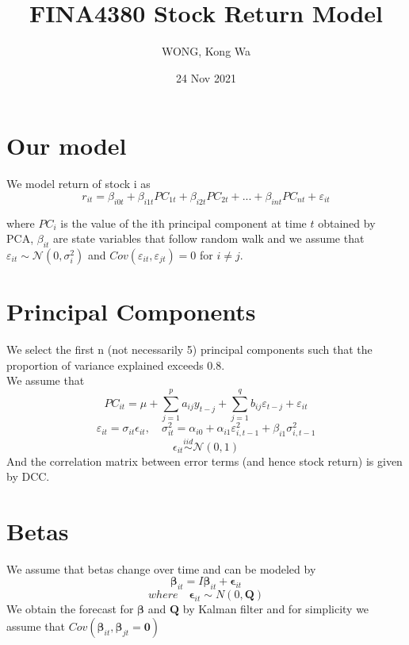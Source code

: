 \documentclass{article}
\title{FINA4380 Stock Return Model}
\author{WONG, Kong Wa}
\date{24 Nov 2021}
\begin{document}
\maketitle
\raggedright
\section{Our model}
We model return of stock i as
\begin{equation*}
	r_{it}=\beta_{i0t}+\beta_{i1t}PC_{1t}+\beta_{i2t}PC_{2t}+...+\beta_{int}PC_{nt}+\varepsilon_{it}
\end{equation*}

where $PC_i$ is the value of the ith principal component at time $t$ obtained by PCA, $\beta_{it}$ are state variables that follow random walk and we assume that $\varepsilon_{it} \sim \mathcal{N}(0, \sigma_i^2)$ and $Cov(\varepsilon_{it},\varepsilon_{jt})=0$ for $i \neq j$.

\section{Principal Components}
We select the first n (not necessarily 5) principal components such that the proportion of variance explained exceeds 0.8. \\
We assume that
\begin{equation*}
	PC_{it}=\mu+\sum_{j=1}^p a_{ij} y_{t-j}+\sum_{j=1}^q b_{ij} \varepsilon_{t-j}+\varepsilon_{it}
\end{equation*}
\begin{equation*}
	\varepsilon_{it}=\sigma_{it} \epsilon_{it}, \quad \sigma_{it}^2=\alpha_{i0}+\alpha_{i1} \varepsilon_{i,t-1}^2+ \beta_{i1} \sigma_{i,t-1}^2
\end{equation*}
\begin{equation*}
    \epsilon_{it} \stackrel{iid}{\sim} \mathcal{N}(0, 1)
\end{equation*}
And the correlation matrix between error terms (and hence stock return) is given by DCC.

\section{Betas}
We assume that betas change over time and can be modeled by
\begin{equation*}
    \mathbf{\beta}_{it} = I\mathbf{\beta}_{it}+\mathbf{\epsilon}_{it}
\end{equation*}
\begin{equation*}
    where \quad \mathbf{\epsilon}_{it} \sim N(0,\mathbf{Q})
\end{equation*}
We obtain the forecast for $\mathbf{\beta}$ and $\mathbf{Q}$ by Kalman filter and for simplicity we assume that $Cov(\mathbf{\beta}_{it}, \mathbf{\beta}_{jt} = \mathbf{0})$
\end{document}
